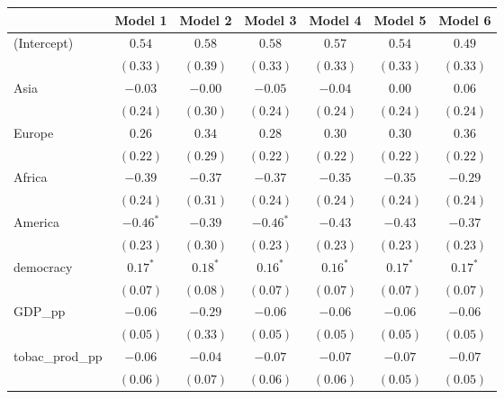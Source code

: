 
\begin{table}[!h]
\begin{center}
\begin{tabular}{l c c c c c c }
\toprule
 & Model 1 & Model 2 & Model 3 & Model 4 & Model 5 & Model 6 \\
\midrule
(Intercept)             & $0.54$      & $0.58$     & $0.58$      & $0.57$      & $0.54$      & $0.49$      \\
                        & $(0.33)$    & $(0.39)$   & $(0.33)$    & $(0.33)$    & $(0.33)$    & $(0.33)$    \\
Asia                    & $-0.03$     & $-0.00$    & $-0.05$     & $-0.04$     & $0.00$      & $0.06$      \\
                        & $(0.24)$    & $(0.30)$   & $(0.24)$    & $(0.24)$    & $(0.24)$    & $(0.24)$    \\
Europe                  & $0.26$      & $0.34$     & $0.28$      & $0.30$      & $0.30$      & $0.36$      \\
                        & $(0.22)$    & $(0.29)$   & $(0.22)$    & $(0.22)$    & $(0.22)$    & $(0.22)$    \\
Africa                  & $-0.39$     & $-0.37$    & $-0.37$     & $-0.35$     & $-0.35$     & $-0.29$     \\
                        & $(0.24)$    & $(0.31)$   & $(0.24)$    & $(0.24)$    & $(0.24)$    & $(0.24)$    \\
America                 & $-0.46^{*}$ & $-0.39$    & $-0.46^{*}$ & $-0.43$     & $-0.43$     & $-0.37$     \\
                        & $(0.23)$    & $(0.30)$   & $(0.23)$    & $(0.23)$    & $(0.23)$    & $(0.23)$    \\
democracy               & $0.17^{*}$  & $0.18^{*}$ & $0.16^{*}$  & $0.16^{*}$  & $0.17^{*}$  & $0.17^{*}$  \\
                        & $(0.07)$    & $(0.08)$   & $(0.07)$    & $(0.07)$    & $(0.07)$    & $(0.07)$    \\
GDP\_pp                 & $-0.06$     & $-0.29$    & $-0.06$     & $-0.06$     & $-0.06$     & $-0.06$     \\
                        & $(0.05)$    & $(0.33)$   & $(0.05)$    & $(0.05)$    & $(0.05)$    & $(0.05)$    \\
tobac\_prod\_pp         & $-0.06$     & $-0.04$    & $-0.07$     & $-0.07$     & $-0.07$     & $-0.07$     \\
                        & $(0.06)$    & $(0.07)$   & $(0.06)$    & $(0.06)$    & $(0.05)$    & $(0.05)$    \\

\end{tabular}
\end{center}
\end{table}
